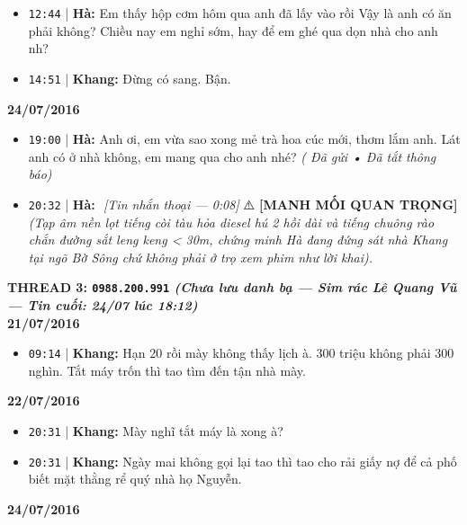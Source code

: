 \documentclass[12pt,a4paper]{article}
\begin{document}
\begin{itemize}[leftmargin=*, itemsep=2pt, topsep=2pt, parsep=0pt]
  \item \texttt{12:44} | \textbf{Hà:} Em thấy hộp cơm hôm qua anh đã lấy vào rồi  Vậy là anh có ăn phải không? Chiều nay em nghỉ sớm, hay để em ghé qua dọn nhà cho anh nh?
  \item \texttt{14:51} | \textbf{Khang:} Đừng có sang. Bận.

\end{itemize}
\textbf{24/07/2016}

\begin{itemize}[leftmargin=*, itemsep=2pt, topsep=2pt, parsep=0pt]
  \item \texttt{19:00} | \textbf{Hà:}  Anh ơi, em vừa sao xong mẻ trà hoa cúc mới, thơm lắm anh. Lát anh có ở nhà không, em mang qua cho anh nhé? \textit{( Đã gửi • Đã tắt thông báo)}
  \item \texttt{20:32} | \textbf{Hà:} ️ \textit{[Tin nhắn thoại — 0:08]} ⚠️ \textbf{[MANH MỐI QUAN TRỌNG]} \textit{(Tạp âm nền lọt tiếng còi tàu hỏa diesel hú 2 hồi dài và tiếng chuông rào chắn đường sắt leng keng < 30m, chứng minh Hà đang đứng sát nhà Khang tại ngõ Bờ Sông chứ không phải ở trọ xem phim như lời khai).}


\end{itemize}

\vspace{0.3cm}\noindent\textbf{\large  THREAD 3: \texttt{0988.200.991} \textit{(Chưa lưu danh bạ — Sim rác Lê Quang Vũ — Tin cuối: 24/07 lúc 18:12)}}\\[0.15cm]


\textbf{21/07/2016}

\begin{itemize}[leftmargin=*, itemsep=2pt, topsep=2pt, parsep=0pt]
  \item \texttt{09:14} | \textbf{Khang:} Hạn 20 rồi mày không thấy lịch à. 300 triệu không phải 300 nghìn. Tắt máy trốn thì tao tìm đến tận nhà mày.

\end{itemize}
\textbf{22/07/2016}

\begin{itemize}[leftmargin=*, itemsep=2pt, topsep=2pt, parsep=0pt]
  \item \texttt{20:31} | \textbf{Khang:} Mày nghĩ tắt máy là xong à?
  \item \texttt{20:31} | \textbf{Khang:} Ngày mai không gọi lại tao thì tao cho rải giấy nợ để cả phố biết mặt thằng rể quý nhà họ Nguyễn.

\end{itemize}
\textbf{24/07/2016}
\end{document}
